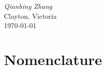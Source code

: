 \documentclass[11pt,a4paper,openany]{book}
\theoremstyle{handbook}
\begin{document}
\bigskip
\begin{flushright}
\textit{Qianbing Zhang}\\
Clayton, Victoria\\
\today
\end{flushright}

\cleardoublepage
{}
\tableofcontents

\cleardoublepage
\chapter*{Nomenclature}
\end{document}

